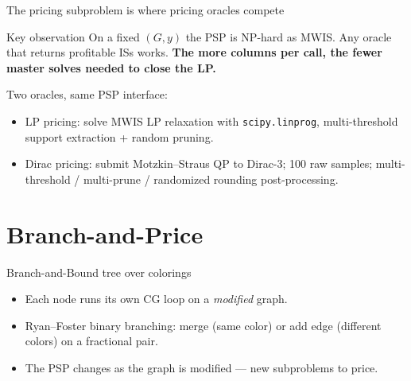 \documentclass[aspectratio=169,11pt]{beamer}
\newcommand{\lpname}{\textcolor{qciblue}{LP pricing}}
\newcommand{\diracname}{\textcolor{qciorange}{Dirac pricing}}
\begin{document}
\begin{frame}{The pricing subproblem is where pricing oracles compete}
  \begin{block}{Key observation}
    On a fixed $(G, y)$ the PSP is NP-hard as MWIS. Any oracle that returns
    profitable ISs works. \textbf{The more columns per call, the fewer master
    solves needed to close the LP.}
  \end{block}

  Two oracles, same PSP interface:
  \begin{itemize}
    \item \lpname: solve MWIS LP relaxation with \texttt{scipy.linprog},
          multi-threshold support extraction + random pruning.
    \item \diracname: submit Motzkin--Straus QP to Dirac-3; 100 raw samples;
          multi-threshold / multi-prune / randomized rounding post-processing.
  \end{itemize}
\end{frame}

\section{Branch-and-Price}

\begin{frame}{Branch-and-Bound tree over colorings}
  \centering
  \vspace{0.5em}
  \begin{itemize}\small
    \item Each node runs its own CG loop on a \emph{modified} graph.
    \item Ryan--Foster binary branching: \textcolor{qcigreen}{merge} (same color) or
          \textcolor{qciorange}{add edge} (different colors) on a fractional pair.
    \item The PSP changes as the graph is modified --- new subproblems to price.
  \end{itemize}
\end{frame}
\end{document}
